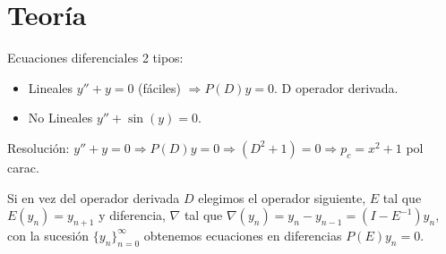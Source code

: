 \chapter{Teor\'ia} \justifying
Ecuaciones diferenciales 2 tipos:
\begin{itemize}
    \item Lineales $y''+y=0$ (fáciles) $\Rightarrow P(D)y=0$. D operador derivada. 
    \item No Lineales $y''+\sin(y)=0$.
\end{itemize}

Resolución: $y''+y=0 \Rightarrow P(D)y=0 \Rightarrow (D^2+1)=0 \Rightarrow p_c = x^2+1$ pol carac.

Si en vez del operador derivada $D$ elegimos el operador siguiente, $E$ tal que $E(y_n) = y_{n+1}$ y diferencia, $\nabla$ tal que $\nabla(y_n) = y_n - y_{n-1} = (I - E^{-1})y_n$, con la sucesión $\{y_n\}_{n=0}^{\infty}$ obtenemos ecuaciones en diferencias $P(E)y_n = 0$.

